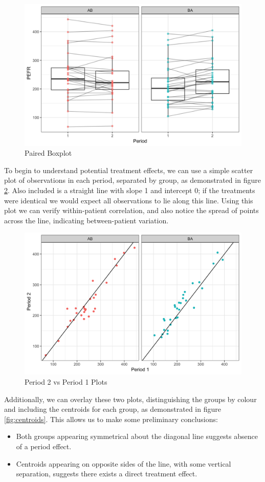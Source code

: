 \documentclass[12pt, TexShade, letterpaper]{report}
\begin{document}
\begin{figure}[ht]
    \centering
    \includegraphics[width=0.85\linewidth]{report/figures/pairedboxplot.png}
    \caption{Paired Boxplot}
    \label{fig:pairedboxplot}
\end{figure}

To begin to understand potential treatment effects, we can use a simple scatter plot of observations in each period, separated by group, as demonstrated in figure \ref{fig:period2vsperiod1}. Also included is a straight line with slope 1 and intercept 0; if the treatments were identical we would expect all observations to lie along this line. Using this plot we can verify within-patient correlation, and also notice the spread of points across the line, indicating between-patient variation.

\begin{figure}[ht]
    \centering
    \includegraphics[width=0.85\linewidth]{report/figures/periodsPlot.png}
    \caption{Period 2 vs Period 1 Plots}
    \label{fig:period2vsperiod1}
\end{figure}

Additionally, we can overlay these two plots, distinguishing the groups by colour and including the centroids for each group, as demonstrated in figure \ref{fig:centroids}. This allows us to make some preliminary conclusions:
\begin{itemize}
    \item Both groups appearing symmetrical about the diagonal line suggests absence of a period effect.
    \item Centroids appearing on opposite sides of the line, with some vertical separation, suggests there exists a direct treatment effect.
\end{itemize}
\end{document}
